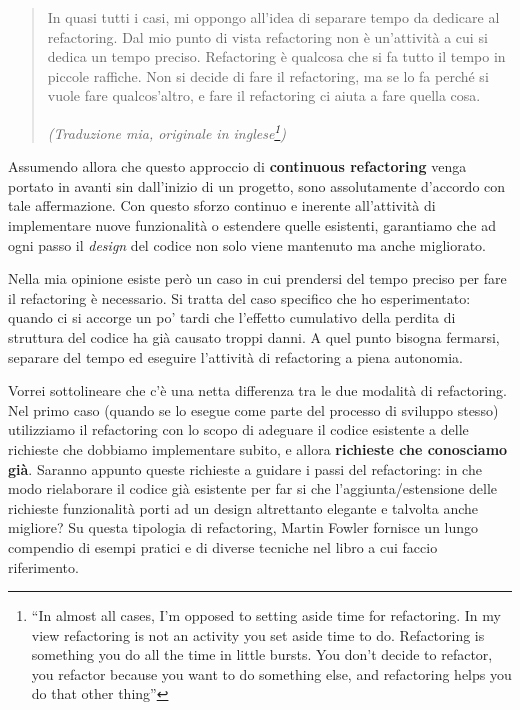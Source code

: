\documentclass[12pt]{report}
\begin{document}
\begin{quote}
In quasi tutti i casi, mi oppongo all'idea di separare tempo da dedicare
al refactoring. Dal mio punto di vista refactoring non è un'attività a cui
si dedica un tempo preciso. Refactoring è qualcosa che si fa tutto il tempo
in piccole raffiche. Non si decide di fare il refactoring, ma se lo fa
perché si vuole fare qualcos'altro, e fare il refactoring ci aiuta a 
fare quella cosa\cite{fowler2002}.

\flushright
\textit{(Traduzione mia, originale in inglese\footnote{
``In almost all cases, I'm opposed to setting aside time for refactoring.
In my view refactoring is not an activity you set aside time to do.
Refactoring is something you do all the time in little bursts. You don't
decide to refactor, you refactor because you want to do something else,
and refactoring helps you do that other thing''
})
}
\end{quote}

Assumendo allora che questo approccio di \textbf{continuous refactoring} venga
portato in avanti sin dall'inizio di un progetto, sono 
assolutamente d'accordo con tale affermazione. Con questo 
sforzo continuo e inerente all'attività di implementare nuove 
funzionalità o estendere quelle esistenti,
garantiamo che ad ogni passo il \textit{design} del codice non solo viene
mantenuto ma anche migliorato.

Nella mia opinione esiste però un caso in cui prendersi del tempo 
preciso per fare il refactoring è necessario. Si tratta del caso specifico che
ho esperimentato: quando ci si accorge un po' tardi che l'effetto 
cumulativo della perdita di struttura del codice ha già causato
troppi danni. A quel punto bisogna fermarsi, separare del tempo 
ed eseguire l'attività di refactoring a piena autonomia.

Vorrei sottolineare che c'è una netta differenza tra le due modalità
di refactoring. Nel primo caso (quando se lo esegue come
parte del processo di sviluppo stesso) utilizziamo il refactoring con lo
scopo di adeguare il codice esistente a delle richieste 
che dobbiamo implementare subito, e allora \textbf{richieste che conosciamo 
già}. Saranno appunto queste richieste a guidare 
i passi del refactoring: in che modo rielaborare il codice già esistente
per far si che l'aggiunta/estensione delle richieste funzionalità porti 
ad un design altrettanto elegante e talvolta anche migliore? 
Su questa tipologia di refactoring, Martin Fowler fornisce un lungo 
compendio di esempi pratici e di diverse
tecniche nel libro a cui faccio riferimento\cite{fowler2003}.
\end{document}
